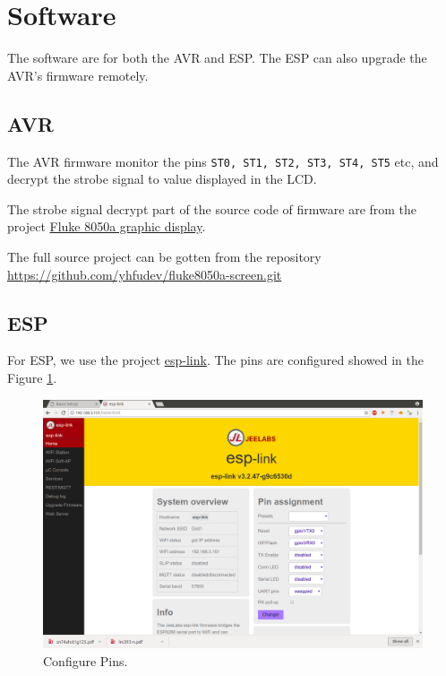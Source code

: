 \documentclass[a4paper,10pt]{article}
\begin{document}
\section{Software}

The software are for both the AVR and ESP.
The ESP can also upgrade the AVR's firmware remotely.

\subsection{AVR}
The AVR firmware monitor the pins \texttt{ST0, ST1, ST2, ST3, ST4, ST5} etc,
and decrypt the strobe signal to value displayed in the LCD.


The strobe signal decrypt part of the source code of firmware are from the project
\href{http://vondervotteimittiss.com/belfry/?p=180}{Fluke 8050a graphic display}.


The full source project can be gotten from the repository \url{https://github.com/yhfudev/fluke8050a-screen.git}



\subsection{ESP}

For ESP, we use the project \href{https://github.com/jeelabs/esp-link.git}{esp-link}.
The pins are configured showed in the Figure \ref{fig:smartshow-confwin}.

\begin{figure}[h!t] \centering
    \includegraphics[width=0.8\linewidth]{figures/smartshow-confwin.png}
    \caption{Configure Pins.} \label{fig:smartshow-confwin}
\end{figure}
\end{document}
